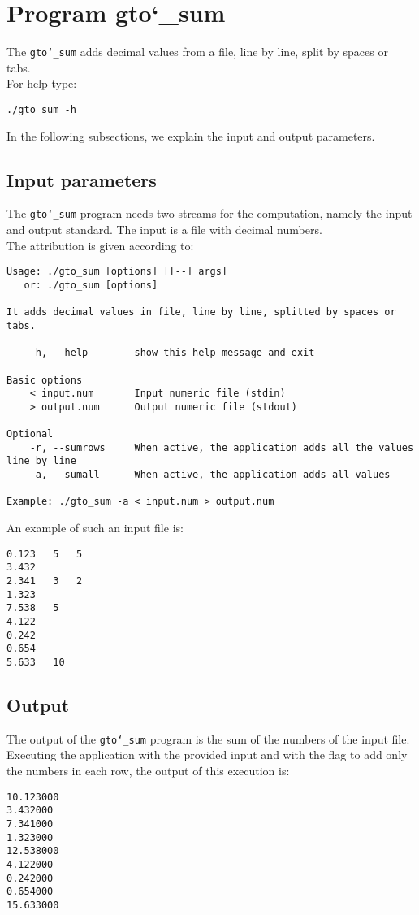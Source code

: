 \section{Program gto\char`_sum}
The \texttt{gto\char`_sum} adds decimal values from a file, line by line, split by spaces or tabs.\\
For help type:
\begin{lstlisting}
./gto_sum -h
\end{lstlisting}
In the following subsections, we explain the input and output parameters.

\subsection*{Input parameters}

The \texttt{gto\char`_sum} program needs two streams for the computation, namely the input and output standard. The input is a file with decimal numbers.\\

The attribution is given according to:
\begin{lstlisting}
Usage: ./gto_sum [options] [[--] args]
   or: ./gto_sum [options]

It adds decimal values in file, line by line, splitted by spaces or tabs.

    -h, --help        show this help message and exit

Basic options
    < input.num       Input numeric file (stdin)
    > output.num      Output numeric file (stdout)

Optional
    -r, --sumrows     When active, the application adds all the values line by line
    -a, --sumall      When active, the application adds all values

Example: ./gto_sum -a < input.num > output.num
\end{lstlisting}
An example of such an input file is:
\begin{lstlisting}
0.123	5	5
3.432
2.341   3   2
1.323
7.538	5
4.122
0.242 
0.654
5.633	10
\end{lstlisting}

\subsection*{Output}
The output of the \texttt{gto\char`_sum} program is the sum of the numbers of the input file.\\
Executing the application with the provided input and with the flag to add only the numbers in each row, the output of this execution is:
\begin{lstlisting}
10.123000
3.432000
7.341000
1.323000
12.538000
4.122000
0.242000
0.654000
15.633000
\end{lstlisting}